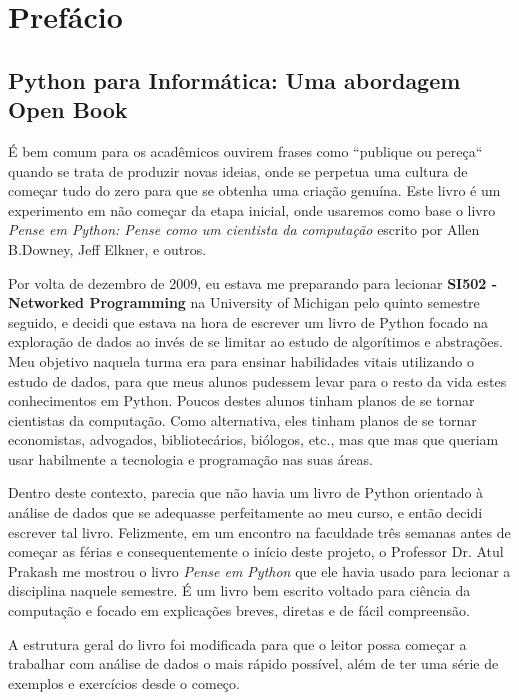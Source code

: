 
\chapter{Prefácio}

\section*{Python para Informática: Uma abordagem Open Book} %

É bem comum para os acadêmicos ouvirem frases como ``publique ou pereça`` quando se trata de produzir novas ideias, onde se perpetua uma cultura de começar tudo do zero para que se obtenha uma criação genuína. Este livro é um experimento em não começar da etapa inicial, onde usaremos como base o livro \emph{Pense em Python: Pense como um cientista da computação} escrito por Allen B.Downey, Jeff Elkner, e outros.

Por volta de dezembro de 2009, eu estava me preparando para lecionar
{\bf SI502 - Networked Programming} na University of Michigan pelo quinto semestre seguido, e decidi que estava na hora de escrever um livro de Python focado na exploração de dados ao invés de se limitar ao estudo de algorítimos e abstrações. Meu objetivo naquela turma era para ensinar habilidades vitais utilizando o estudo de dados, para que meus alunos pudessem levar para o resto da vida estes conhecimentos em Python. Poucos destes alunos tinham planos de se tornar cientistas da computação. Como alternativa, eles tinham planos de se tornar economistas, advogados, bibliotecários, biólogos, etc., mas que
mas que queriam usar habilmente a tecnologia e programação nas suas áreas.

Dentro deste contexto, parecia que não havia um livro de Python orientado à análise de dados que se adequasse perfeitamente ao meu curso, e então decidi escrever tal livro. Felizmente, em um encontro na faculdade três semanas antes de começar as férias e consequentemente o início deste projeto, o Professor Dr. Atul Prakash me mostrou o livro \emph{Pense em Python} que ele havia usado para lecionar a disciplina naquele semestre. É um livro bem escrito voltado para ciência da computação e focado em explicações breves, diretas e de fácil compreensão.

A estrutura geral do livro foi modificada para que o leitor possa começar a trabalhar com análise de dados o mais rápido possível, além de ter uma série de exemplos e exercícios desde o começo.

